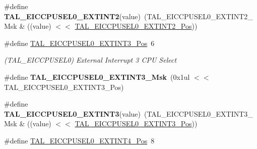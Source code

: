 \begin{DoxyCompactItemize}
\item 
\hypertarget{group___s_a_m_l21___t_a_l_ga8680cefd54ff3db8e4bd93555b8831d9}{}\#define {\bfseries T\+A\+L\+\_\+\+E\+I\+C\+C\+P\+U\+S\+E\+L0\+\_\+\+E\+X\+T\+I\+N\+T2}(value)~(T\+A\+L\+\_\+\+E\+I\+C\+C\+P\+U\+S\+E\+L0\+\_\+\+E\+X\+T\+I\+N\+T2\+\_\+\+Msk \& ((value) $<$$<$ \hyperlink{group___s_a_m_l21___t_a_l_gabc96e29420d608f7b4e758e04f7ae07b}{T\+A\+L\+\_\+\+E\+I\+C\+C\+P\+U\+S\+E\+L0\+\_\+\+E\+X\+T\+I\+N\+T2\+\_\+\+Pos}))\label{group___s_a_m_l21___t_a_l_ga8680cefd54ff3db8e4bd93555b8831d9}

\item 
\hypertarget{group___s_a_m_l21___t_a_l_ga1ed627fcd284d7fbcd38f9313538187f}{}\#define \hyperlink{group___s_a_m_l21___t_a_l_ga1ed627fcd284d7fbcd38f9313538187f}{T\+A\+L\+\_\+\+E\+I\+C\+C\+P\+U\+S\+E\+L0\+\_\+\+E\+X\+T\+I\+N\+T3\+\_\+\+Pos}~6\label{group___s_a_m_l21___t_a_l_ga1ed627fcd284d7fbcd38f9313538187f}

\begin{DoxyCompactList}\small\item\em (T\+A\+L\+\_\+\+E\+I\+C\+C\+P\+U\+S\+E\+L0) External Interrupt 3 C\+P\+U Select \end{DoxyCompactList}\item 
\hypertarget{group___s_a_m_l21___t_a_l_ga7a7df2ac62fd37089914e8bdea887617}{}\#define {\bfseries T\+A\+L\+\_\+\+E\+I\+C\+C\+P\+U\+S\+E\+L0\+\_\+\+E\+X\+T\+I\+N\+T3\+\_\+\+Msk}~(0x1ul $<$$<$ T\+A\+L\+\_\+\+E\+I\+C\+C\+P\+U\+S\+E\+L0\+\_\+\+E\+X\+T\+I\+N\+T3\+\_\+\+Pos)\label{group___s_a_m_l21___t_a_l_ga7a7df2ac62fd37089914e8bdea887617}

\item 
\hypertarget{group___s_a_m_l21___t_a_l_gaa323e7690760c2a51963f821a42a32f3}{}\#define {\bfseries T\+A\+L\+\_\+\+E\+I\+C\+C\+P\+U\+S\+E\+L0\+\_\+\+E\+X\+T\+I\+N\+T3}(value)~(T\+A\+L\+\_\+\+E\+I\+C\+C\+P\+U\+S\+E\+L0\+\_\+\+E\+X\+T\+I\+N\+T3\+\_\+\+Msk \& ((value) $<$$<$ \hyperlink{group___s_a_m_l21___t_a_l_ga1ed627fcd284d7fbcd38f9313538187f}{T\+A\+L\+\_\+\+E\+I\+C\+C\+P\+U\+S\+E\+L0\+\_\+\+E\+X\+T\+I\+N\+T3\+\_\+\+Pos}))\label{group___s_a_m_l21___t_a_l_gaa323e7690760c2a51963f821a42a32f3}

\item 
\hypertarget{group___s_a_m_l21___t_a_l_gabf21e1c2dfcc285c676b41993b40dadd}{}\#define \hyperlink{group___s_a_m_l21___t_a_l_gabf21e1c2dfcc285c676b41993b40dadd}{T\+A\+L\+\_\+\+E\+I\+C\+C\+P\+U\+S\+E\+L0\+\_\+\+E\+X\+T\+I\+N\+T4\+\_\+\+Pos}~8\label{group___s_a_m_l21___t_a_l_gabf21e1c2dfcc285c676b41993b40dadd}


\end{DoxyCompactItemize}
